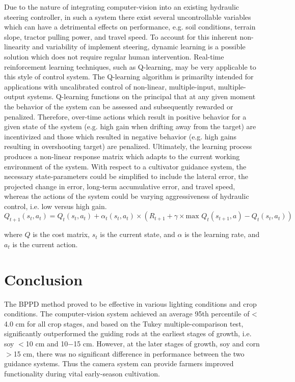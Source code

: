 \documentclass[authoryear]{elsarticle}
\begin{document}
Due to the nature of integrating computer-vision into an existing
hydraulic steering controller, in such a system there exist several
uncontrollable variables which can have a detrimental effects on
performance, e.g. soil conditions, terrain slope, tractor pulling
power, and travel speed. To account for this inherent non-linearity
and variability of implement steering, dynamic learning is a possible
solution which does not require regular human intervention. Real-time
reinforcement learning techniques, such as Q-learning, may be very
applicable to this style of control system. The Q-learning algorithm
is primarilty intended for applications with uncalibrated control of
non-linear, multiple-input, multiple-output systems.  Q-learning
functions on the principal that at any given moment the behavior of
the system can be assessed and subsequently rewarded or
penalized. Therefore, over-time actions which result in positive
behavior for a given state of the system (e.g. high gain when drifting
away from the target) are incentivized and those which resulted in
negative behavior (e.g. high gains resulting in overshooting target)
are penalized. Ultimately, the learning process produces a non-linear
response matrix which adapts to the current working environment of the
system. With respect to a cultivator guidance system, the necessary
state-parameters could be simplified to include the lateral error, the
projected change in error, long-term accumulative error, and travel
speed, whereas the actions of the system could be varying
aggressiveness of hydraulic control, i.e. low versus high gain.
\begin{equation}
  Q_{t+1}(s_t,a_t) = Q_{t}(s_t,a_t) + \alpha_{t}(s_t,a_t) \times
  \left( R_{t+1} + \gamma \times \text{max } Q_{t}(s_{t+1},a) - Q_{t}(s_{t},a_{t}) \right)
  \label{eq:qlearning}
\end{equation}
\begin{flushleft}
where $Q$ is the cost matrix, $s_{t}$ is the current state, and $\alpha$
is the learning rate, and $a_{t}$ is the current action. 
\end{flushleft}

\section{Conclusion}
The BPPD method proved to be effective in various lighting conditions
and crop conditions. The computer-vision system achieved an average
95th percentile of < 4.0 cm for all crop stages, and based on the
Tukey multiple-comparison test, significantly outperformed the guiding
rods at the earliest stages of growth, i.e. soy $<$10 cm and 10$-$15
cm. However, at the later stages of growth, soy and corn $>$15 cm, there
was no significant difference in performance between the two guidance
systems. Thus the camera system can provide farmers improved
functionality during vital early-season cultivation.
\end{document}

